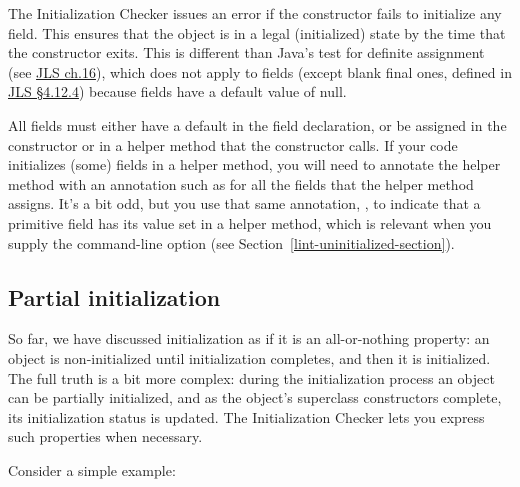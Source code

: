 The Initialization Checker issues an error if the constructor fails to initialize
any  field.  This ensures that the object is in a legal (initialized)
state by the time that the constructor exits.
This is different than Java's test for definite assignment (see
\href{https://docs.oracle.com/javase/specs/jls/se8/html/jls-16.html}{JLS ch.16}),
which does not apply to fields (except blank final ones, defined in
\href{https://docs.oracle.com/javase/specs/jls/se8/html/jls-4.html#jls-4.12.4}{JLS \S 4.12.4}) because fields
have a default value of null.


All  fields must either have a
default in the field declaration, or be assigned in the constructor or in a
helper method that the constructor calls.  If
your code initializes (some) fields in a helper method, you will need to
annotate the helper method with an annotation such as
for all the fields that the helper method assigns.
It's a bit odd, but you use that same annotation, ,
to indicate that a primitive field has its value set in a helper method,
which is relevant when you supply the 
command-line option (see Section~\ref{lint-uninitialized-section}).



\subsection{Partial initialization\label{partial-initialization}}

So far, we have discussed initialization as if it is an all-or-nothing property:
an object is non-initialized until initialization completes, and then it is initialized.  The full truth is a bit more complex:  during the
initialization process an object can be partially initialized, and as the
object's superclass constructors complete, its initialization status is updated.  The
Initialization Checker lets you express such properties when necessary.

Consider a simple example:

